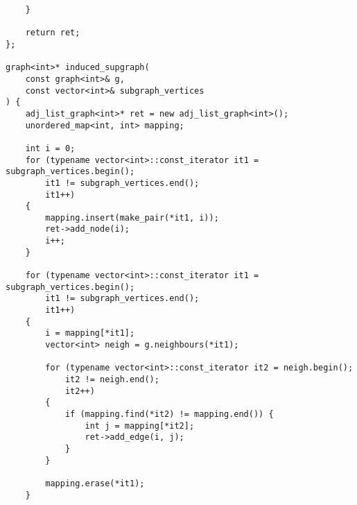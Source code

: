 \begin{lstlisting}
    }

    return ret;
};

graph<int>* induced_supgraph(
    const graph<int>& g,
    const vector<int>& subgraph_vertices
) {
    adj_list_graph<int>* ret = new adj_list_graph<int>();
    unordered_map<int, int> mapping;

    int i = 0;
    for (typename vector<int>::const_iterator it1 = subgraph_vertices.begin();
        it1 != subgraph_vertices.end();
        it1++)
    {
        mapping.insert(make_pair(*it1, i));
        ret->add_node(i);
        i++;
    }

    for (typename vector<int>::const_iterator it1 = subgraph_vertices.begin();
        it1 != subgraph_vertices.end();
        it1++)
    {
        i = mapping[*it1];
        vector<int> neigh = g.neighbours(*it1);

        for (typename vector<int>::const_iterator it2 = neigh.begin();
            it2 != neigh.end();
            it2++)
        {
            if (mapping.find(*it2) != mapping.end()) {
                int j = mapping[*it2];
                ret->add_edge(i, j);
            }
        }

        mapping.erase(*it1);
    }

\end{lstlisting}

